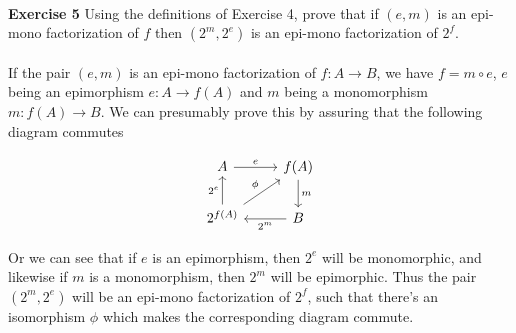 \documentclass[a4paper,12pt,twoside,leqno]{article}
\begin{document}
\paragraph*{}
\textbf{Exercise 5} Using the definitions of Exercise 4, prove that if $(e, m)$ is an epi-mono factorization of $f$ then $(2^m, 2^e)$ is an epi-mono factorization of $2^f$.\paragraph*{}
If the pair $(e, m)$ is an epi-mono factorization of $f: A \rightarrow B$, we have $f = m \circ e$, $e$ being an epimorphism $e: A \rightarrow f(A)$ and $m$ being a monomorphism $m: f(A) \rightarrow B$. We can presumably prove this by assuring that the following diagram commutes

$$
\begin{tikzcd}
A \arrow[r, "e"] & f(A) \arrow[d, "m"] \\
2^{f(A)} \arrow[u, "2^{e}"] \arrow[ru, "\phi"] & B \arrow[l, "2^{m}"]
\end{tikzcd}
$$

Or we can see that if $e$ is an epimorphism, then $2^e$ will be monomorphic, and likewise if $m$ is a monomorphism, then $2^m$ will be epimorphic. Thus the pair $(2^m, 2^e)$ will be an epi-mono factorization of $2^f$, such that there's an isomorphism $\phi$ which makes the corresponding diagram commute.
\end{document}

